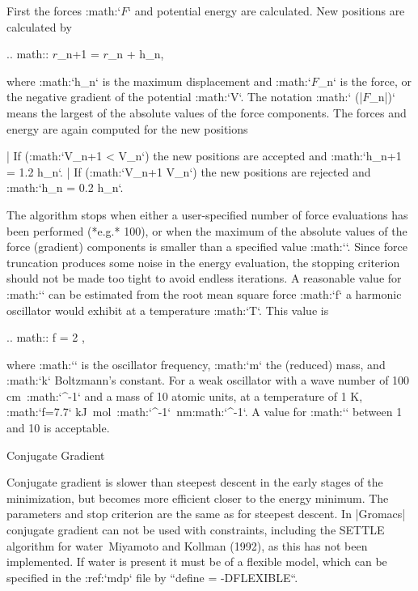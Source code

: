 First the forces :math:`{\mbox{\boldmath ${F}$}}` and potential energy
are calculated. New positions are calculated by

  .. math:: {\mbox{\boldmath ${r}$}}_{n+1} =  {\mbox{\boldmath ${r}$}}_n +  h_n,

where :math:`h_n` is the maximum displacement and
:math:`{\mbox{\boldmath ${F}$}}_n` is the force, or the negative
gradient of the potential :math:`V`. The notation :math:`\max
(|{\mbox{\boldmath ${F}$}}_n|)` means the largest of the absolute
values of the force components. The forces and energy are again
computed for the new positions

| If (:math:`V_{n+1} < V_n`) the new positions are accepted and
  :math:`h_{n+1} = 1.2
  h_n`.
| If (:math:`V_{n+1} \geq V_n`) the new positions are rejected and
  :math:`h_n = 0.2 h_n`.

The algorithm stops when either a user-specified number of force
evaluations has been performed (*e.g.* 100), or when the maximum of the
absolute values of the force (gradient) components is smaller than a
specified value :math:`\epsilon`. Since force truncation produces some
noise in the energy evaluation, the stopping criterion should not be
made too tight to avoid endless iterations. A reasonable value for
:math:`\epsilon` can be estimated from the root mean square force
:math:`f` a harmonic oscillator would exhibit at a temperature
:math:`T`. This value is

.. math:: f = 2 \pi \nu {},

where :math:`\nu` is the oscillator frequency, :math:`m` the (reduced)
mass, and :math:`k` Boltzmann’s constant. For a weak oscillator with a
wave number of 100 cm\ :math:`^{-1}` and a mass of 10 atomic units, at a
temperature of 1 K, :math:`f=7.7` kJ mol\ :math:`^{-1}` nm:math:`^{-1}`.
A value for :math:`\epsilon` between 1 and 10 is acceptable.

Conjugate Gradient
~~~~~~~~~~~~~~~~~~

Conjugate gradient is slower than steepest descent in the early stages
of the minimization, but becomes more efficient closer to the energy
minimum. The parameters and stop criterion are the same as for steepest
descent. In |Gromacs| conjugate gradient can not be used with constraints,
including the SETTLE algorithm for water Miyamoto and Kollman (1992), as
this has not been implemented. If water is present it must be of a
flexible model, which can be specified in the :ref:`mdp` file
by ``define = -DFLEXIBLE``.

